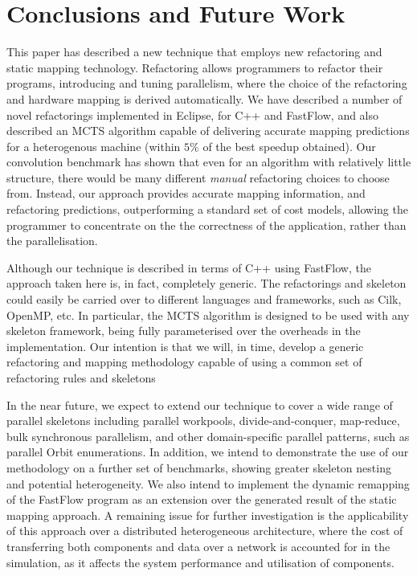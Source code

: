 \documentclass[smallextended]{svjour3}
\begin{document}
\section{Conclusions and Future Work}
\noindent
This paper has described a new technique that employs new
refactoring and static mapping technology. Refactoring allows programmers
to refactor their programs, introducing and tuning parallelism, where the choice of the refactoring and hardware mapping is derived automatically.
We have described a number of novel refactorings implemented in Eclipse, for C++ and FastFlow, and also described
an MCTS algorithm capable of delivering accurate mapping predictions for a heterogenous machine (within $5\%$ of the best speedup obtained).
Our convolution benchmark has shown that even for an algorithm with relatively little structure, there would be many different
\emph{manual} refactoring choices to choose from. Instead, our approach 
provides accurate mapping information, and refactoring predictions, outperforming a standard set of cost models, allowing the programmer to concentrate on the
the correctness of the application, rather than the parallelisation. 

Although our technique is described in terms of C++ using FastFlow, the approach taken here is,
in fact, completely generic. The refactorings and skeleton could easily be carried over to different languages and frameworks, such 
as Cilk, OpenMP, etc. In particular, the MCTS algorithm is designed to be used with any skeleton framework, 
being fully parameterised over the overheads in the implementation. Our intention is that we will, in time, develop
a generic refactoring and mapping methodology capable of using a common set of refactoring rules and skeletons  

In the near future, we expect to extend our technique to cover a wide range of parallel skeletons
including parallel workpools, divide-and-conquer, map-reduce, bulk synchronous parallelism, and other domain-specific
parallel patterns, such as parallel Orbit enumerations.
In addition, we intend to demonstrate the use of our methodology on a further set of benchmarks, showing greater skeleton nesting and potential heterogeneity. We also intend to implement the dynamic remapping of the FastFlow program as an extension over the generated result of the static mapping approach.
A remaining issue for further investigation is the applicability of this approach over a distributed heterogeneous architecture, where the cost of transferring both components and
data over a network is accounted for in the simulation, as it affects the system performance and utilisation of components. 
\end{document}
